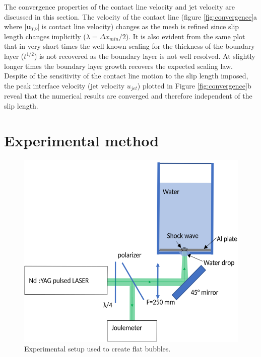 \documentclass[final]{jfm}
\begin{document}
 The convergence properties of the contact line velocity and jet velocity 
 are discussed in this section. The velocity of the contact line (figure \ref{fig:convergence}a where $\vert {\mathbf u}_{TP}\vert$ is contact line velocity) changes as the mesh is refined since slip length changes implicitly ($\lambda = \Delta x_{min}/2$). It is also evident from the same plot that in very short times the well known scaling for the thickness of the boundary layer ($t^{1/2}$) is not recovered as the boundary layer is not well resolved. At slightly longer times the boundary layer growth recovers the expected scaling law. Despite of the sensitivity of the contact line motion to the slip length imposed, the peak interface velocity (jet velocity $u_{jet}$) plotted in Figure \ref{fig:convergence}b reveal that the numerical results are converged and therefore independent of the slip length.

\section{Experimental method}
\label{appB}


\begin{figure}
  \centering
  \includegraphics{figsv2/Fig11.eps}
  \caption{Experimental setup used to create flat bubbles.}
\label{fig:experimental}
\end{figure}
\end{document}
